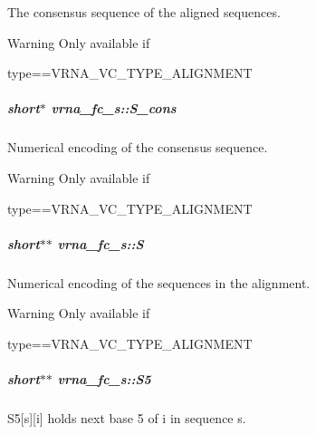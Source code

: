 The consensus sequence of the aligned sequences. 

\begin{DoxyWarning}{Warning}
Only available if\begin{DoxyVerb}type==VRNA_VC_TYPE_ALIGNMENT \end{DoxyVerb}
 
\end{DoxyWarning}
\hypertarget{group__fold__compound_aa3fab7ae38ebfed2028375221d295686}{}
\subparagraph[{S\+\_\+cons}]{\setlength{\rightskip}{0pt plus 5cm}short$\ast$ vrna\+\_\+fc\+\_\+s\+::\+S\+\_\+cons}\label{group__fold__compound_aa3fab7ae38ebfed2028375221d295686}


Numerical encoding of the consensus sequence. 

\begin{DoxyWarning}{Warning}
Only available if\begin{DoxyVerb}type==VRNA_VC_TYPE_ALIGNMENT \end{DoxyVerb}
 
\end{DoxyWarning}
\hypertarget{group__fold__compound_aebb37297f92c7bd22aac6343f8f61d61}{}
\subparagraph[{S}]{\setlength{\rightskip}{0pt plus 5cm}short$\ast$$\ast$ vrna\+\_\+fc\+\_\+s\+::\+S}\label{group__fold__compound_aebb37297f92c7bd22aac6343f8f61d61}


Numerical encoding of the sequences in the alignment. 

\begin{DoxyWarning}{Warning}
Only available if\begin{DoxyVerb}type==VRNA_VC_TYPE_ALIGNMENT \end{DoxyVerb}
 
\end{DoxyWarning}
\hypertarget{group__fold__compound_a78d089b475e2230bd536b9a6ed8bb17c}{}
\subparagraph[{S5}]{\setlength{\rightskip}{0pt plus 5cm}short$\ast$$\ast$ vrna\+\_\+fc\+\_\+s\+::\+S5}\label{group__fold__compound_a78d089b475e2230bd536b9a6ed8bb17c}


S5\mbox{[}s\mbox{]}\mbox{[}i\mbox{]} holds next base 5\textquotesingle{} of i in sequence s. 

